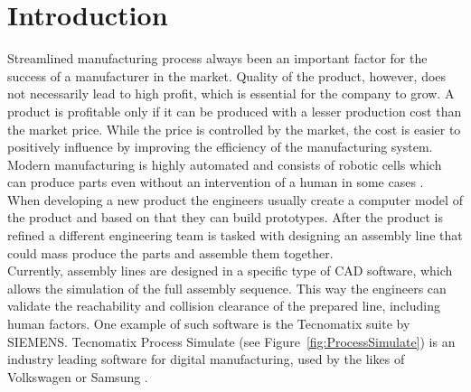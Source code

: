 \chapter{Introduction}
\label{ch:introduction}
\graphicspath{ {chapters/Introduction/} }

Streamlined manufacturing process always been an important factor for the success of a manufacturer in the market. 
Quality of the product, however, does not necessarily lead to high profit, which is essential for the company to grow. 
A product is profitable only if it can be produced with a lesser production cost than the market price. 
While the price is controlled by the market, the cost is easier to positively influence by improving the efficiency of the manufacturing system. 
Modern manufacturing is highly automated and consists of robotic cells which can produce parts even without an intervention of a human in some cases \cite{VirtualCommisioning}. \\

When developing a new product the engineers usually create a computer model of the product and based on that they can build prototypes. After the product is refined a different engineering team is tasked with designing an assembly line that could mass produce the parts and assemble them together. \\
 
Currently, assembly lines are designed in a specific type of CAD software, which allows the simulation of the full assembly sequence.
This way the engineers can validate the reachability and collision clearance of the prepared line, including human factors.
One example of such software is the Tecnomatix suite by SIEMENS. Tecnomatix Process Simulate (see Figure~\ref{fig:ProcessSimulate}) is an industry leading software for digital manufacturing, used by the likes of Volkswagen or Samsung \cite{TecnomatixCustomers}. \\ 


